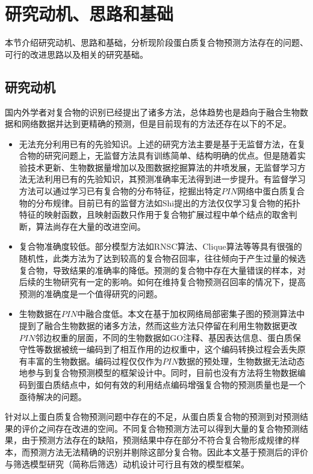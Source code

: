 \section{研究动机、思路和基础}
\label{section:intro:motivationAndThinking}

本节介绍研究动机、思路和基础，分析现阶段蛋白质复合物预测方法存在的问题、可行的改进思路以及相关的研究基础。

\subsection{研究动机}
\label{subsection:motivationAndThinking:motivation}
国内外学者对复合物的识别已经提出了诸多方法，总体趋势也是趋向于融合生物数据和网络数据并达到更精确的预测，但是目前现有的方法还存在以下的不足。
\begin{itemize}
  \item 无法充分利用已有的先验知识。上述的研究方法主要是基于无监督方法，在复合物的研究问题上，无监督方法具有训练简单、结构明确的优点。但是随着实验技术更新、生物数据量增加以及图数据挖掘算法的井喷发展，无监督学习方法无法利用已有的先验知识，其预测准确率无法得到进一步提升。有监督学习方法可以通过学习已有复合物的分布特征，挖掘出特定$PIN$网络中蛋白质复合物的分布规律。目前已有的监督方法如Shi提出的方法\cite{shi_protein_2011}仅仅学习复合物的拓扑特征的映射函数，且映射函数只作用于复合物扩展过程中单个结点的取舍判断，算法尚存在大量的改进空间。

  \item 复合物准确度较低。部分模型方法如RNSC算法\cite{king_protein_2004}、Clique算法\cite{spirin_protein_2003}等等具有很强的随机性，此类方法为了达到较高的复合物召回率，往往倾向于产生过量的候选复合物，导致结果的准确率的降低。预测的复合物中存在大量错误的样本，对后续的生物研究有一定的影响。如何在维持复合物预测召回率的情况下，提高预测的准确度是一个值得研究的问题。

  \item 生物数据在$PIN$中融合度低。本文在基于加权网络局部密集子图的预测算法中提到了融合生物数据的诸多方法，然而这些方法只停留在利用生物数据更改$PIN$邻边权重的层面，不同的生物数据如GO注释、基因表达信息、蛋白质保守性等数据被统一编码到了相互作用的边权重中，这个编码转换过程会丢失原有丰富的生物数据。编码过程仅仅作为$PIN$数据的预处理，生物数据无法动态地参与到复合物预测模型的框架设计中。同时，目前也没有方法将生物数据编码到蛋白质结点中，如何有效的利用结点编码增强复合物的预测质量也是一个亟待解决的问题。
\end{itemize}

针对以上蛋白质复合物预测问题中存在的不足，从蛋白质复合物的预测到对预测结果的评价之间存在改进的空间。不同复合物预测方法可以得到大量的复合物预测结果，由于预测方法存在的缺陷，预测结果中存在部分不符合复合物形成规律的样本，而预测方法无法精确的识别并剔除这部分复合物。因此本文基于预测后的评价与筛选模型研究（简称后筛选）动机设计可行且有效的模型框架。

